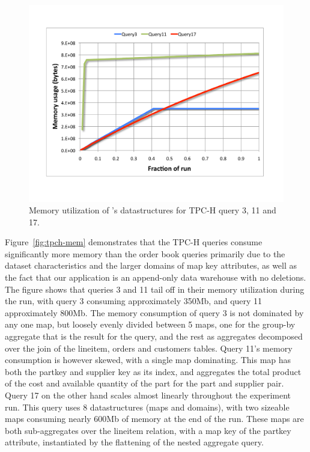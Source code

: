 \begin{figure}[htbp]
\includegraphics[scale=0.33]{figures/tpch-mem}
\caption{Memory utilization of \compiler's datastructures for TPC-H query 3, 11
  and 17.}
\label{fig:tpchmem}
\end{figure}

Figure~\ref{fig:tpch-mem} demonstrates that the TPC-H queries consume
significantly more memory than the order book queries primarily due to the
dataset characteristics and the larger domains of map key attributes, as well as
the fact that our application is an append-only data warehouse with no
deletions. The figure shows that queries 3 and 11 tail off in their memory
utilization during the run, with query 3 consuming approximately 350Mb, and
query 11 approximately 800Mb. The memory consumption of query 3 is not dominated
by any one map, but loosely evenly divided between 5 maps, one for the group-by
aggregate that is the result for the query, and the rest as aggregates
decomposed over the join of the lineitem, orders and customers tables. Query
11's memory consumption is however skewed, with a single map dominating. This
map has both the partkey and supplier key as its index, and aggregates the total
product of the cost and available quantity of the part for the part and supplier
pair. Query 17 on the other hand scales almost linearly throughout the
experiment run. This query uses 8 datastructures (maps and domains), with two
sizeable maps consuming nearly 600Mb of memory at the end of the run. These maps
are both sub-aggregates over the lineitem relation, with a map key of the
partkey attribute, instantiated by the flattening of the nested aggregate query.

